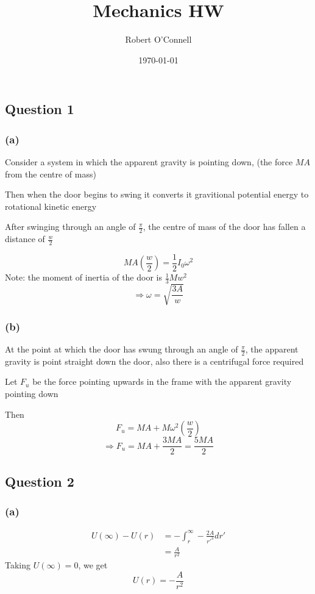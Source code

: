 \documentclass{article}
\title{\textbf{Mechanics HW}}
\author{Robert O'Connell}
\date{\today}
\begin{document}
\maketitle
\vspace{5mm}

\subsection*{Question 1}
\subsubsection*{(a)}
Consider a system in which the apparent gravity is pointing down, 
(the force \(MA\) from the centre of mass)

Then when the door begins to swing it converts it gravitional potential energy to 
rotational kinetic energy 

After swinging through an angle of \(\frac{\pi}{2}\), the centre of mass of the 
door has fallen a distance of \(\frac{w}{2}\)

\[
MA\left(\frac{w}{2}\right) = \frac{1}{2} I_0 \omega^2
\]
Note: the moment of inertia of the door is \(\frac{1}{3}Mw^2\)
\[
\Rightarrow \omega = \sqrt{\frac{3A}{w}}
\]

\subsubsection*{(b)}
At the point at which the door has swung through an angle of \(\frac{\pi}{2}\), the apparent 
gravity is point straight down the door, also there is a centrifugal force required

Let \(F_u\) be the force pointing upwards in the frame with the apparent gravity pointing 
down

Then
\[
F_u = MA + M\omega^2 \left(\frac{w}{2}\right)
\]
\[
\Rightarrow F_u = MA + \frac{3MA}{2} = \frac{5MA}{2}
\]



\subsection*{Question 2}
\subsubsection*{(a)}
\begin{align*}
    U(\infty) - U(r) &= - \int_{r}^{\infty} -\frac{2A}{r'^3} dr' \\
    &= \frac{A}{r^2}
\end{align*}
Taking \(U(\infty) = 0\), we get
\[
U(r) = -\frac{A}{r^2}
\]
\end{document}
